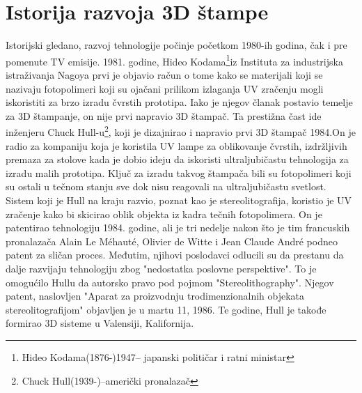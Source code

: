\documentclass[a4paper]{article}
\begin{document}
\section{Istorija razvoja 3D štampe \cite{c}}


\bigbreak Istorijski gledano, razvoj tehnologije počinje početkom 1980-ih godina, čak i pre pomenute TV emisije. 1981. godine, Hideo Kodama\footnote{Hideo Kodama(1876-)1947– japanski političar i ratni ministar}iz Instituta za industrijska istraživanja Nagoya prvi je objavio račun o tome kako se materijali koji se nazivaju fotopolimeri koji su ojačani prilikom izlaganja UV zračenju mogli iskoristiti za brzo izradu čvrstih prototipa. Iako je njegov članak postavio temelje za 3D štampanje, on nije prvi napravio 3D štampač. 
\bigbreak Ta prestižna čast ide inženjeru Chuck Hull-u\footnote{Chuck Hull(1939-)–američki pronalazač}, koji je dizajnirao i napravio prvi 3D štampač 1984.On je radio za kompaniju koja je koristila UV lampe za oblikovanje čvrstih, izdržljivih premaza za stolove kada je dobio ideju da iskoristi ultraljubičastu tehnologija za izradu malih prototipa. 
\bigbreak Ključ za izradu takvog štampača bili su fotopolimeri koji su ostali u tečnom stanju sve dok nisu reagovali na ultraljubičastu svetlost. Sistem koji je Hull na kraju razvio, poznat kao je stereolitografija, koristio je UV zračenje kako bi skicirao oblik objekta iz kadra tečnih fotopolimera. 
\bigbreak On je patentirao tehnologiju 1984. godine, ali je tri nedelje nakon što je tim francuskih pronalazača Alain Le Méhauté, Olivier de Witte i Jean Claude André podneo patent za sličan proces. Međutim, njihovi poslodavci odlucili su da prestanu da dalje razvijaju tehnologiju zbog "nedostatka poslovne perspektive". To je omogućilo Hullu da autorsko pravo pod pojmom "Stereolithography". Njegov patent, naslovljen "Aparat za proizvodnju trodimenzionalnih objekata stereolitografijom" objavljen je u martu 11, 1986. Te godine, Hull je takođe formirao 3D sisteme u Valensiji, Kalifornija.
\end{document}
